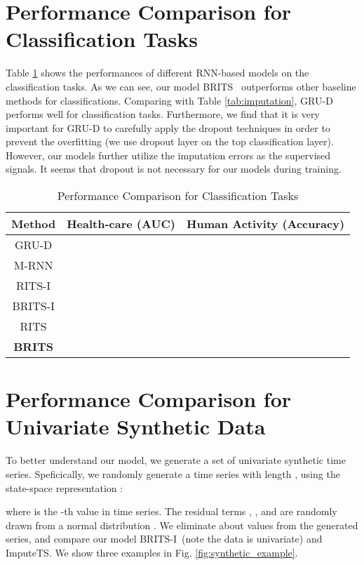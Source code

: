 \documentclass{article}
\newcommand{\ritsi}{\xspace{RITS-I}}
\newcommand{\britsi}{\xspace{BRITS-I}}
\newcommand{\rits}{\xspace{RITS}}
\newcommand{\brits}{\xspace{BRITS}}
\begin{document}
 \section{Performance Comparison for Classification Tasks}
 \label{appendix:classification}
 Table \ref{tab:classification} shows the performances of different RNN-based models on the classification tasks. As we can see, our model \brits~ outperforms other baseline methods for classifications. Comparing with Table \ref{tab:imputation}, GRU-D performs well for classification tasks. Furthermore, we find that it is very important for GRU-D to carefully apply the dropout techniques in order to prevent the overfitting (we use  dropout layer on the top classification layer). However, our models further utilize the imputation errors as the supervised signals. It seems that dropout is not necessary for our models during training.
 
  \begin{table}[htbp]
\centering
\renewcommand\arraystretch{1.2}
\caption{Performance Comparison for Classification Tasks}
\label{tab:classification}
\begin{tabular}{c|c|c}
\hline
Method                 & Health-care  (AUC)     & Human Activity (Accuracy)    \\ \hline
GRU-D                  &  &  \\ \hline
M-RNN                  &  &  \\ \hline\hline
\ritsi  &  &  \\ \hline 
\britsi &  &  \\ \hline
\rits   &  &  \\ \hline
{\bf \brits}  &  &  \\ \hline
\end{tabular}
\end{table}



\section{Performance Comparison for Univariate Synthetic Data}
\label{appendix:synthetic}
To better understand our model, we generate a set of univariate synthetic time series. 
Speficically, we randomly generate a time series with length , using the state-space representation \cite{harvey1990forecasting}: 

where  is the -th value in time series. The residual terms , ,  and  are randomly drawn from a normal distribution . We eliminate about  values from the generated series, and compare our model \britsi~(note the data is univariate) and ImputeTS. We show three examples in Fig. \ref{fig:synthetic_example}.
\end{document}
